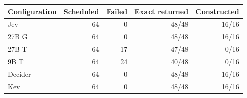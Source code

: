 \begin{tabular}{lrrrr}
\toprule
Configuration & Scheduled & Failed & Exact returned & Constructed \\
\midrule
Jev & 64 & 0 & 48/48 & 16/16 \\
27B G & 64 & 0 & 48/48 & 16/16 \\
27B T & 64 & 17 & 47/48 & 0/16 \\
9B T & 64 & 24 & 40/48 & 0/16 \\
Decider & 64 & 0 & 48/48 & 16/16 \\
Kev & 64 & 0 & 48/48 & 16/16 \\
\bottomrule
\end{tabular}
